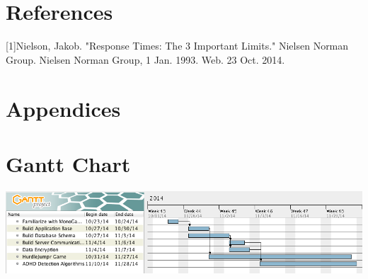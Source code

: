 \documentclass[a4wide]{article}
\begin{document}
\section{References}
[1]Nielson, Jakob. "Response Times: The 3 Important Limits." Nielsen Norman Group. Nielsen Norman Group, 1 Jan. 1993. Web. 23 Oct. 2014.
\section{Appendices}

\section{Gantt Chart}
\includegraphics[width=\textwidth]{images/Gantt.png}
\end{document}
